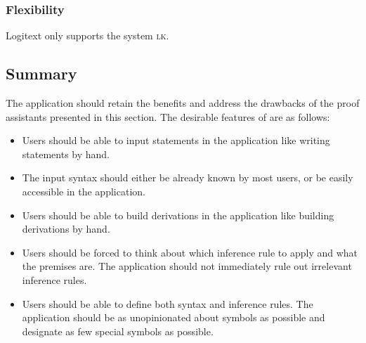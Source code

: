 \subsubsection{Flexibility}
Logitext only supports the system \textsc{lk}.

\subsection{Summary}
The application should retain the benefits and address the drawbacks of the proof assistants presented in this section. The desirable features of \projectname{} are as follows:
\begin{itemize}
    \item Users should be able to input statements in the application like writing statements by hand.
    \item The input syntax should either be already known by most users, or be easily accessible in the application.
    \item Users should be able to build derivations in the application like building derivations by hand.
    \item Users should be forced to think about which inference rule to apply and what the premises are. The application should not immediately rule out irrelevant inference rules.
    \item Users should be able to define both syntax and inference rules. The application should be as unopinionated about symbols as possible and designate as few special symbols as possible.
\end{itemize}